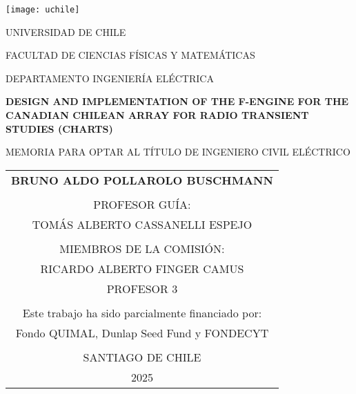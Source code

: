 \documentclass[
	12pt,
	letterpaper,
  oneside
  ]{book}
\begin{document}
  \thispagestyle{empty}
	\def\arraystretch{1.15}
  
  \begin{minipage}[t]{0.125\linewidth}
    \texttt{[image: uchile]}
  \end{minipage}
  \begin{minipage}[b]{0.8\linewidth}
    \MakeUppercase{Universidad de Chile}

    \MakeUppercase{Facultad de Ciencias Físicas y Matemáticas}

    \MakeUppercase{Departamento Ingeniería Eléctrica}
	\end{minipage}

	\begin{center}
    \vspace{1.5cm}

    \MakeUppercase{\textbf{Design and implementation of the F-engine for the Canadian Chilean Array for Radio Transient Studies (CHARTS)}}

    \vspace{1.5cm}


    \MakeUppercase{Memoria para optar al título de ingeniero civil eléctrico}
	
    \vfill

    \begin{tabular}{c}
      \MakeUppercase{\textbf{Bruno Aldo Pollarolo Buschmann}} \\
      \vspace{1.0cm} \\
      PROFESOR GUÍA: \\
      TOMÁS ALBERTO CASSANELLI ESPEJO \\
      \vspace{0.5cm} \\
      MIEMBROS DE LA COMISIÓN: \\
      RICARDO ALBERTO FINGER CAMUS \\
      PROFESOR 3 \\
      \vspace{0.5cm} \\
      Este trabajo ha sido parcialmente financiado por: \\
      Fondo QUIMAL, Dunlap Seed Fund y FONDECYT \\
      \vspace{0.5cm} \\
      \MakeUppercase{Santiago de Chile} \\
      \MakeUppercase{2025}
    \end{tabular}

	\end{center}
\end{document}
